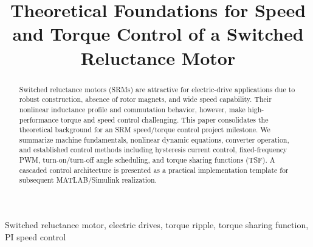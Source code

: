 \documentclass[conference]{IEEEtran}
\begin{document}
\title{Theoretical Foundations for Speed and Torque Control of a Switched Reluctance Motor}

\author{%
\and
{}
\and
{}
\and
{}
}

\maketitle

\begin{abstract}
Switched reluctance motors (SRMs) are attractive for electric-drive applications due to robust
construction, absence of rotor magnets, and wide speed capability. Their nonlinear inductance
profile and commutation behavior, however, make high-performance torque and speed control
challenging. This paper consolidates the theoretical background for an SRM speed/torque control
project milestone. We summarize machine fundamentals, nonlinear dynamic equations,
converter operation, and established control methods including hysteresis current control,
fixed-frequency PWM, turn-on/turn-off angle scheduling, and torque sharing functions (TSF).
A cascaded control architecture is presented as a practical implementation template for
subsequent MATLAB/Simulink realization.
\end{abstract}

\begin{IEEEkeywords}
Switched reluctance motor, electric drives, torque ripple, torque sharing function, PI speed control
\end{IEEEkeywords}
\end{document}

